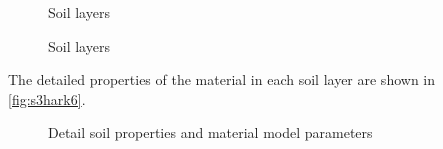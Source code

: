 \begin{figure}[!htbp]
  \caption{Soil layers }
  \label{fig:s3harkSoilColumn}
\end{figure}


\begin{figure}[!htbp]
  \caption{Soil layers }
  \label{fig:s3hark5}
\end{figure}


The detailed properties of the material in each soil layer are shown in \autoref{fig:s3hark6}.

\begin{figure}[!htbp]
  \centering 
    
  \caption{Detail soil properties and material model parameters}
  \label{fig:s3hark6}
\end{figure}

